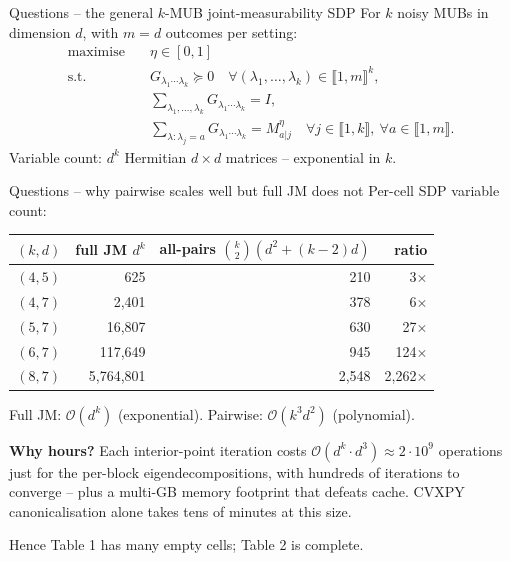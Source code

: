 \documentclass[10pt,aspectratio=169]{beamer}
\begin{document}
\begin{frame}{Questions -- the general $k$-MUB joint-measurability SDP}
  For $k$ noisy MUBs in dimension $d$, with $m = d$ outcomes per setting:
  \[
  \begin{aligned}
    \text{maximise} \quad & \eta \in [0, 1] \\
    \text{s.t.} \quad     & G_{\lambda_1 \cdots \lambda_k} \succeq 0
                            \quad \forall (\lambda_1, \dots, \lambda_k) \in \llbracket 1, m \rrbracket^k, \\
                          & \textstyle\sum_{\lambda_1, \dots, \lambda_k} G_{\lambda_1 \cdots \lambda_k} = I, \\
                          & \textstyle\sum_{\lambda : \lambda_j = a} G_{\lambda_1 \cdots \lambda_k}
                            = M^{\eta}_{a | j}
                            \quad \forall j \in \llbracket 1, k \rrbracket,\ \forall a \in \llbracket 1, m \rrbracket.
  \end{aligned}
  \]
  Variable count: $d^{k}$ Hermitian $d \times d$ matrices -- \alert{exponential in $k$}.
\end{frame}

\begin{frame}{Questions -- why pairwise scales well but full JM does not}
  Per-cell SDP variable count:
  \medskip
  \centering
  \begin{tabular}{c|rr|r}
    \toprule
    $(k, d)$ & full JM $d^{k}$ & all-pairs $\binom{k}{2}(d^2 + (k-2)d)$ & ratio \\
    \midrule
    $(4, 5)$ & 625              & 210                                    & 3$\times$ \\
    $(4, 7)$ & 2{,}401          & 378                                    & 6$\times$ \\
    $(5, 7)$ & 16{,}807         & 630                                    & 27$\times$ \\
    $(6, 7)$ & 117{,}649        & 945                                    & 124$\times$ \\
    $(8, 7)$ & \alert{5{,}764{,}801} & 2{,}548                            & 2{,}262$\times$ \\
    \bottomrule
  \end{tabular}

  \bigskip
  Full JM: \alert{$\mathcal{O}(d^k)$} (exponential).
  \quad Pairwise: \alert{$\mathcal{O}(k^3 d^2)$} (polynomial).

  \medskip
  \footnotesize
  \textbf{Why hours?}
  Each interior-point iteration costs $\mathcal{O}(d^k \cdot d^3) \approx 2 \cdot 10^9$
  operations just for the per-block eigendecompositions, with hundreds of iterations to
  converge -- plus a multi-GB memory footprint that defeats cache. CVXPY
  canonicalisation alone takes tens of minutes at this size.

  \medskip
  \normalsize
  Hence Table 1 has many empty cells; Table 2 is complete.
\end{frame}
\end{document}
